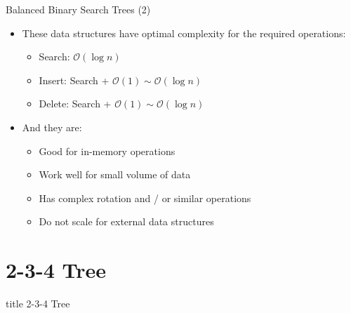 \documentclass[aspectratio=169, xcolor=dvipsnames]{beamer}
\begin{document}
\begin{frame}{Balanced Binary Search Trees (2)}
    \begin{itemize}[<+->]
        \item These data structures have optimal complexity for the required operations:
        \begin{itemize}[<+->]
            \item Search: $\mathcal{O}(\log n)$
            \item Insert: Search + $\mathcal{O}(1) \sim \mathcal{O}(\log n)$
            \item Delete: Search + $\mathcal{O}(1) \sim \mathcal{O}(\log n)$
        \end{itemize}
        \item And they are:
        \begin{itemize}[<+->]
            \item Good for in-memory operations
            \item Work well for small volume of data
            \item Has complex rotation and / or similar operations
            \item Do not scale for external data structures
        \end{itemize}
    \end{itemize}
\end{frame}

\section{2-3-4 Tree}
\begin{frame}
  \vfill
  \centering
  \begin{beamercolorbox}[sep=8pt,center,shadow=true,rounded=true]{title}
    2-3-4 Tree\par%
  \end{beamercolorbox}
  \vfill
\end{frame}
\end{document}

